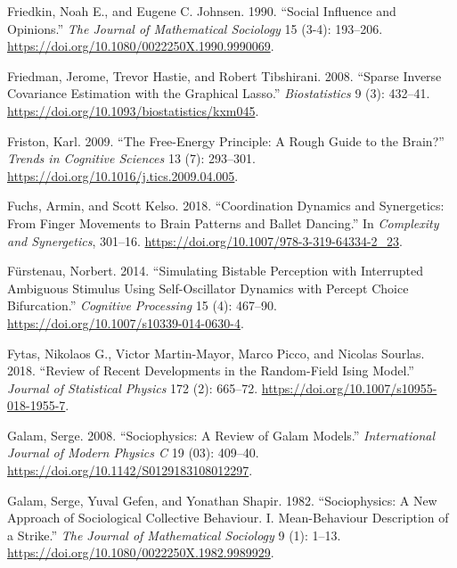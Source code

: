 \documentclass[
  a4paper,
  DIV=11,
  numbers=noendperiod,
  oneside]{scrreprt}
\newlength{\cslhangindent}
\newenvironment{CSLReferences}[2] %
 {\begin{list}{}{%
  \setlength{\itemindent}{0pt}
  \setlength{\leftmargin}{0pt}
  \setlength{\parsep}{0pt}
  \ifodd #1
   \setlength{\leftmargin}{\cslhangindent}
   \setlength{\itemindent}{-1\cslhangindent}
  \fi
  \setlength{\itemsep}{#2\baselineskip}}}
 {\end{list}}
\begin{document}
\begin{CSLReferences}{1}{0}
Friedkin, Noah E., and Eugene C. Johnsen. 1990. {``Social Influence and
Opinions.''} \emph{The Journal of Mathematical Sociology} 15 (3-4):
193--206. \url{https://doi.org/10.1080/0022250X.1990.9990069}.

Friedman, Jerome, Trevor Hastie, and Robert Tibshirani. 2008. {``Sparse
Inverse Covariance Estimation with the Graphical Lasso.''}
\emph{Biostatistics} 9 (3): 432--41.
\url{https://doi.org/10.1093/biostatistics/kxm045}.

Friston, Karl. 2009. {``The Free-Energy Principle: A Rough Guide to the
Brain?''} \emph{Trends in Cognitive Sciences} 13 (7): 293--301.
\url{https://doi.org/10.1016/j.tics.2009.04.005}.

Fuchs, Armin, and Scott Kelso. 2018. {``Coordination {Dynamics} and
{Synergetics}: {From Finger Movements} to {Brain Patterns} and {Ballet
Dancing}.''} In \emph{Complexity and {Synergetics}}, 301--16.
\url{https://doi.org/10.1007/978-3-319-64334-2_23}.

Fürstenau, Norbert. 2014. {``Simulating Bistable Perception with
Interrupted Ambiguous Stimulus Using Self-Oscillator Dynamics with
Percept Choice Bifurcation.''} \emph{Cognitive Processing} 15 (4):
467--90. \url{https://doi.org/10.1007/s10339-014-0630-4}.

Fytas, Nikolaos G., Victor Martin-Mayor, Marco Picco, and Nicolas
Sourlas. 2018. {``Review of Recent Developments in the Random-Field
{Ising} Model.''} \emph{Journal of Statistical Physics} 172 (2):
665--72. \url{https://doi.org/10.1007/s10955-018-1955-7}.

Galam, Serge. 2008. {``Sociophysics: A Review of Galam Models.''}
\emph{International Journal of Modern Physics C} 19 (03): 409--40.
\url{https://doi.org/10.1142/S0129183108012297}.

Galam, Serge, Yuval Gefen, and Yonathan Shapir. 1982. {``Sociophysics:
{A} New Approach of Sociological Collective Behaviour. {I}.
Mean-Behaviour Description of a Strike.''} \emph{The Journal of
Mathematical Sociology} 9 (1): 1--13.
\url{https://doi.org/10.1080/0022250X.1982.9989929}.


\end{CSLReferences}
\end{document}
